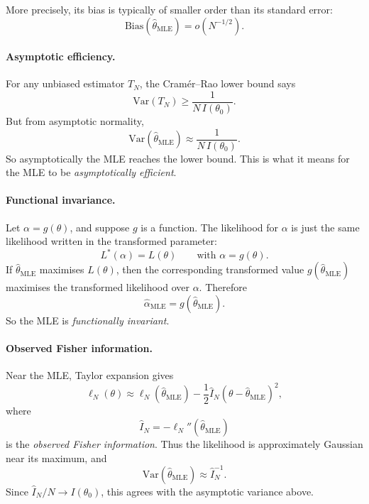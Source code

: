 \documentclass[11pt, titlepage]{article} %
\numberwithin{equation}{section}
\theoremstyle{definition}
\numberwithin{assumption}{section}
\begin{document}
More precisely, its bias is typically of smaller order than its standard error:
\begin{equation*}
    \mathrm{Bias}(\hat{\theta}_{\mathrm{MLE}})=o(N^{-1/2}).
\end{equation*}

\paragraph{Asymptotic efficiency.}

For any unbiased estimator $T_N$, the Cram\'er--Rao lower bound says
\begin{equation*}
    \mathrm{Var}(T_N)\ge \frac{1}{N\,I(\theta_0)}.
\end{equation*}
But from asymptotic normality,
\begin{equation*}
    \mathrm{Var}(\hat{\theta}_{\mathrm{MLE}})
    \approx
    \frac{1}{N\,I(\theta_0)}.
\end{equation*}
So asymptotically the MLE reaches the lower bound. This is what it means for the MLE to be \textit{asymptotically efficient}.

\paragraph{Functional invariance.}

Let $\alpha=g(\theta)$, and suppose $g$ is a function. The likelihood for $\alpha$ is just the same likelihood written in the transformed parameter:
\begin{equation*}
    L^*(\alpha)=L(\theta)
    \qquad \text{with } \alpha=g(\theta).
\end{equation*}
If $\hat{\theta}_{\mathrm{MLE}}$ maximises $L(\theta)$, then the corresponding transformed value $g(\hat{\theta}_{\mathrm{MLE}})$ maximises the transformed likelihood over $\alpha$. Therefore
\begin{equation*}
    \hat{\alpha}_{\mathrm{MLE}}=g(\hat{\theta}_{\mathrm{MLE}}).
\end{equation*}
So the MLE is \textit{functionally invariant}.

\paragraph{Observed Fisher information.}

Near the MLE, Taylor expansion gives
\begin{equation*}
    \ell_N(\theta)
    \approx
    \ell_N(\hat{\theta}_{\mathrm{MLE}})
    -\frac{1}{2}\hat{I}_N(\theta-\hat{\theta}_{\mathrm{MLE}})^2,
\end{equation*}
where
\begin{equation*}
    \hat{I}_N
    =
    -\ell_N''(\hat{\theta}_{\mathrm{MLE}})
\end{equation*}
is the \textit{observed Fisher information}. Thus the likelihood is approximately Gaussian near its maximum, and
\begin{equation*}
    \mathrm{Var}(\hat{\theta}_{\mathrm{MLE}})
    \approx
    \hat{I}_N^{-1}.
\end{equation*}
Since $\hat{I}_N/N \to I(\theta_0)$, this agrees with the asymptotic variance above.
\end{document}
